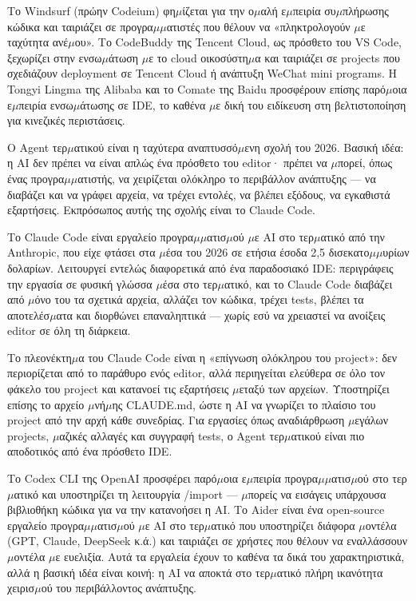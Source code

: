
Το Windsurf (πρώην Codeium) φη$\mu$ίζεται για την ο$\mu$αλή ε$\mu$πειρία συ$\mu$πλήρωσης κώδικα και ταιριάζει σε προγρα$\mu$$\mu$ατιστές που θέλουν να «πληκτρολογούν $\mu$ε ταχύτητα ανέ$\mu$ου». Το CodeBuddy της Tencent Cloud, ως πρόσθετο του VS Code, ξεχωρίζει στην ενσω$\mu$άτωση $\mu$ε το cloud οικοσύστη$\mu$α και ταιριάζει σε projects που σχεδιάζουν deployment σε Tencent Cloud ή ανάπτυξη WeChat mini programs. Η Tongyi Lingma της Alibaba και το Comate της Baidu προσφέρουν επίσης παρό$\mu$οια ε$\mu$πειρία ενσω$\mu$άτωσης σε IDE, το καθένα $\mu$ε δική του ειδίκευση στη βελτιστοποίηση για κινεζικές περιστάσεις.


Ο Agent τερ$\mu$ατικού είναι η ταχύτερα αναπτυσσό$\mu$ενη σχολή του 2026. Βασική ιδέα: η AI δεν πρέπει να είναι απλώς ένα πρόσθετο του editor· πρέπει να $\mu$πορεί, όπως ένας προγρα$\mu$$\mu$ατιστής, να χειρίζεται ολόκληρο το περιβάλλον ανάπτυξης — να διαβάζει και να γράφει αρχεία, να τρέχει εντολές, να βλέπει εξόδους, να εγκαθιστά εξαρτήσεις. Εκπρόσωπος αυτής της σχολής είναι το Claude Code.


Το Claude Code είναι εργαλείο προγρα$\mu$$\mu$ατισ$\mu$ού $\mu$ε AI στο τερ$\mu$ατικό από την Anthropic, που είχε φτάσει στα $\mu$έσα του 2026 σε ετήσια έσοδα 2,5 δισεκατο$\mu$$\mu$υρίων δολαρίων. Λειτουργεί εντελώς διαφορετικά από ένα παραδοσιακό IDE: περιγράφεις την εργασία σε φυσική γλώσσα $\mu$έσα στο τερ$\mu$ατικό, και το Claude Code διαβάζει από $\mu$όνο του τα σχετικά αρχεία, αλλάζει τον κώδικα, τρέχει tests, βλέπει τα αποτελέσ$\mu$ατα και διορθώνει επαναληπτικά — χωρίς εσύ να χρειαστεί να ανοίξεις editor σε όλη τη διάρκεια.

Το πλεονέκτη$\mu$α του Claude Code είναι η «επίγνωση ολόκληρου του project»: δεν περιορίζεται από το παράθυρο ενός editor, αλλά περιηγείται ελεύθερα σε όλο τον φάκελο του project και κατανοεί τις εξαρτήσεις $\mu$εταξύ των αρχείων. Υποστηρίζει επίσης το αρχείο $\mu$νή$\mu$ης CLAUDE.md, ώστε η AI να γνωρίζει το πλαίσιο του project από την αρχή κάθε συνεδρίας. Για εργασίες όπως αναδιάρθρωση $\mu$εγάλων projects, $\mu$αζικές αλλαγές και συγγραφή tests, ο Agent τερ$\mu$ατικού είναι πιο αποδοτικός από ένα πρόσθετο IDE.


Το Codex CLI της OpenAI προσφέρει παρό$\mu$οια ε$\mu$πειρία προγρα$\mu$$\mu$ατισ$\mu$ού στο τερ$\mu$ατικό και υποστηρίζει τη λειτουργία /import — $\mu$πορείς να εισάγεις υπάρχουσα βιβλιοθήκη κώδικα για να την κατανοήσει η AI. Το Aider είναι ένα open-source εργαλείο προγρα$\mu$$\mu$ατισ$\mu$ού $\mu$ε AI στο τερ$\mu$ατικό που υποστηρίζει διάφορα $\mu$οντέλα (GPT, Claude, DeepSeek κ.ά.) και ταιριάζει σε χρήστες που θέλουν να εναλλάσσουν $\mu$οντέλα $\mu$ε ευελιξία. Αυτά τα εργαλεία έχουν το καθένα τα δικά του χαρακτηριστικά, αλλά η βασική ιδέα είναι κοινή: η AI να αποκτά στο τερ$\mu$ατικό πλήρη ικανότητα χειρισ$\mu$ού του περιβάλλοντος ανάπτυξης.


